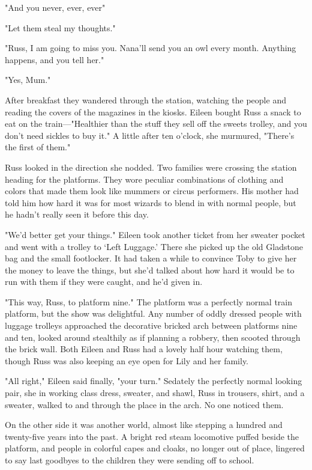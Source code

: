 "And you never, ever, ever{\el}"

"Let them steal my thoughts."

"Russ, I am going to miss you. Nana'll send you an owl every month. Anything happens, and you tell her."

"Yes, Mum."

After breakfast they wandered through the station, watching the people and reading the covers of the magazines in the kiosks. Eileen bought Russ a snack to eat on the train—"Healthier than the stuff they sell off the sweets trolley, and you don't need sickles to buy it." A little after ten o'clock, she murmured, "There's the first of them."

Russ looked in the direction she nodded. Two families were crossing the station heading for the platforms. They wore peculiar combinations of clothing and colors that made them look like mummers or circus performers. His mother had told him how hard it was for most wizards to blend in with normal people, but he hadn't really seen it before this day.

"We'd better get your things." Eileen took another ticket from her sweater pocket and went with a trolley to `Left Luggage.' There she picked up the old Gladstone bag and the small footlocker. It had taken a while to convince Toby to give her the money to leave the things, but she'd talked about how hard it would be to run with them if they were caught, and he'd given in.

"This way, Russ, to platform nine." The platform was a perfectly normal train platform, but the show was delightful. Any number of oddly dressed people with luggage trolleys approached the decorative bricked arch between platforms nine and ten, looked around stealthily as if planning a robbery, then scooted through the brick wall. Both Eileen and Russ had a lovely half hour watching them, though Russ was also keeping an eye open for Lily and her family.

"All right," Eileen said finally, "your turn." Sedately the perfectly normal looking pair, she in working class dress, sweater, and shawl, Russ in trousers, shirt, and a sweater, walked to and through the place in the arch. No one noticed them.

On the other side it was another world, almost like stepping a hundred and twenty-five years into the past. A bright red steam locomotive puffed beside the platform, and people in colorful capes and cloaks, no longer out of place, lingered to say last goodbyes to the children they were sending off to school.

